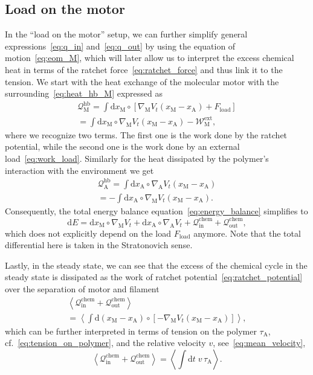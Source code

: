\documentclass[aps,pre,twocolumn,showpacs,showkeys,superscriptaddress,floatfix]{revtex4-1}
\newcommand{\rmd}{{\mathrm d}}
\begin{document}
\subsection{Load on the motor}
In the ``load on the motor'' setup, we can further simplify general expressions~\eqref{eq:q_in} and~\eqref{eq:q_out} 
by using the equation of motion~\eqref{eq:eom_M}, 
which will later allow us to interpret the excess chemical heat in terms of the ratchet force~\eqref{eq:ratchet_force} and thus link it to the tension.  
We start with the heat exchange of the molecular motor with the surrounding~\eqref{eq:heat_hb_M} expressed as 
\begin{multline}
{\mathcal Q}_\text{M}^\text{hb} 
= \int \rmd x_\text{M} \circ \left[ \nabla_\text{M} V_t(x_\text{M} - x_\text{A} ) + F_\text{load} \right] 
\\
= \int \rmd x_\text{M} \circ \nabla_\text{M} V_t(x_\text{M} - x_\text{A} ) - {\mathcal W}_\text{M}^\text{ext} ,
\label{eq:heat_hb_M_expl}
\end{multline}
where we recognize two terms. 
The first one is the work done by the ratchet potential, while the second one is the work done by an external load~\eqref{eq:work_load}. 
Similarly for the heat dissipated by the polymer's interaction with the environment we get 
\begin{multline}
{\mathcal Q}_\text{A}^\text{hb} 
= \int \rmd x_\text{A} \circ \nabla_\text{A} V_t(x_\text{M} - x_\text{A} )
\\
= - \int \rmd x_\text{A} \circ \nabla_\text{M} V_t(x_\text{M} - x_\text{A} ) .
\label{eq:heat_hb_A_expl}
\end{multline}
Consequently, the total energy balance equation~\eqref{eq:energy_balance} simplifies to 
\[
\rmd E 
= \rmd x_\text{M} \circ \nabla_\text{M} V_t  
+ \rmd x_\text{A} \circ \nabla_\text{A} V_t  
+ {\mathcal Q}_\text{in}^\text{chem}
+ {\mathcal Q}_\text{out}^\text{chem} , 
\]
which does not explicitly depend on the load $F_\text{load}$ anymore. 
Note that the total differential here is taken in the Stratonovich sense. 

Lastly, in the steady state, 
we can see that the excess of the chemical cycle in the steady state is dissipated as the work of ratchet potential~\eqref{eq:ratchet_potential} over the separation of motor and filament 
\begin{multline}
\left\langle 
{\mathcal Q}_\text{in}^\text{chem} + {\mathcal Q}_\text{out}^\text{chem} 
\right\rangle 
\\
= 
\left\langle 
\int \rmd \left( x_\text{M} - x_\text{A} \right) \circ \left[ - \nabla_\text{M} V_t( x_\text{M} - x_\text{A} ) \right]
\right\rangle ,
\label{eq:chemical_excess}
\end{multline} 
which can be further interpreted in terms of tension on the polymer $\tau_\text{A}$, cf.~\eqref{eq:tension_on_polymer}, and the relative velocity $v$, see~\eqref{eq:mean_velocity}, 
\begin{equation}
\left\langle 
{\mathcal Q}_\text{in}^\text{chem} + {\mathcal Q}_\text{out}^\text{chem} 
\right\rangle 
= \left\langle \int \rmd t \; v \, \tau_\text{A} \right\rangle .
\label{eq:excess_heat} 
\end{equation}
\end{document}

